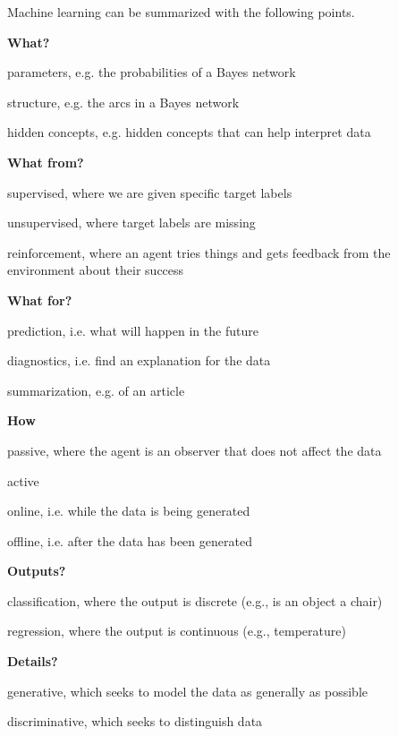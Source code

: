 \documentclass[10pt,a4paper]{article}
\newenvironment{itemize_packed}{
\begin{itemize}
\setlength{\itemsep}{0pt}
\setlength{\parskip}{0pt}
}{\end{itemize}}
\begin{document}
Machine learning can be summarized with the following points.
\begin{itemize_packed}
\item \textbf{What?}
\begin{itemize_packed}
\item parameters, e.g. the probabilities of a Bayes network
\item structure, e.g. the arcs in a Bayes network
\item hidden concepts, e.g. hidden concepts that can help interpret data
\end{itemize_packed}

\item \textbf{What from?}
\begin{itemize_packed}
\item supervised, where we are given specific target labels
\item unsupervised, where target labels are missing
\item reinforcement, where an agent tries things and gets feedback from the environment about their success
\end{itemize_packed}

\item \textbf{What for?}
\begin{itemize_packed}
\item prediction, i.e. what will happen in the future
\item diagnostics, i.e. find an explanation for the data
\item summarization, e.g. of an article
\end{itemize_packed}

\item \textbf{How}
\begin{itemize_packed}
\item passive, where the agent is an observer that does not affect the data
\item active
\item online, i.e. while the data is being generated
\item offline, i.e. after the data has been generated
\end{itemize_packed}

\item \textbf{Outputs?}
\begin{itemize_packed}
\item classification, where the output is discrete (e.g., is an object a chair)
\item regression, where the output is continuous (e.g., temperature)
\end{itemize_packed}

\item \textbf{Details?}
\begin{itemize_packed}
\item generative, which seeks to model the data as generally as possible
\item discriminative, which seeks to distinguish data
\end{itemize_packed}

\end{itemize_packed}
\end{document}
